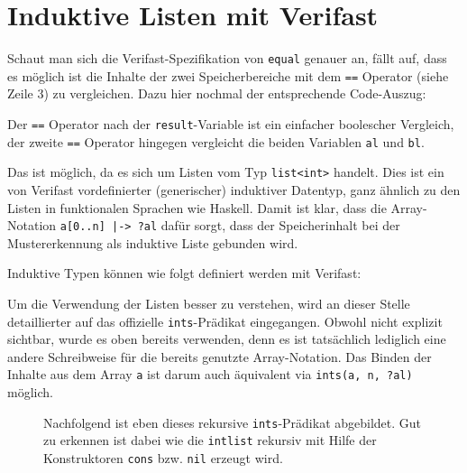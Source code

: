 \section{Induktive Listen mit Verifast}
\label{sec:induktive-listen}

Schaut man sich die Verifast-Spezifikation von \lstinline{equal} genauer an, fällt auf, dass es 
möglich ist die Inhalte der zwei Speicherbereiche mit dem \lstinline{==} Operator (siehe Zeile 3) zu vergleichen. 
Dazu hier nochmal der entsprechende Code-Auszug:



Der \lstinline{==} Operator nach der \lstinline{result}-Variable ist ein einfacher boolescher Vergleich,
der zweite \lstinline{==} Operator hingegen vergleicht die beiden Variablen \lstinline{al} und \lstinline{bl}.

Das ist möglich, da es sich um Listen vom Typ \lstinline{list<int>} handelt. Dies ist ein
von Verifast vordefinierter (generischer) induktiver Datentyp, ganz ähnlich zu den Listen in funktionalen 
Sprachen wie Haskell. Damit ist klar, dass die Array-Notation \lstinline{a[0..n] |-> ?al} dafür sorgt, 
dass der Speicherinhalt bei der Mustererkennung als induktive Liste gebunden wird.

Induktive Typen können wie folgt definiert werden mit Verifast:



Um die Verwendung der Listen besser zu verstehen, wird an dieser Stelle detaillierter auf das offizielle 
\lstinline{ints}-Prädikat eingegangen. Obwohl nicht explizit sichtbar, wurde es oben bereits verwenden, 
denn es ist tatsächlich lediglich eine andere Schreibweise für die bereits genutzte Array-Notation. 
Das Binden der Inhalte aus dem Array \lstinline{a} ist darum auch äquivalent via 
\lstinline{ints(a, n, ?al)} möglich.

\begin{figure}[H]
Nachfolgend ist eben dieses rekursive \lstinline{ints}-Prädikat abgebildet. Gut zu erkennen ist dabei
wie die \lstinline{intlist} rekursiv mit Hilfe der Konstruktoren \lstinline{cons} bzw. \lstinline{nil} 
erzeugt wird.

\end{figure}

